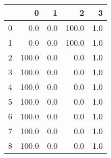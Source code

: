 \begin{tabular}{lrrrr}
\toprule
{} &      0 &    1 &      2 &    3 \\
\midrule
0 &    0.0 &  0.0 &  100.0 &  1.0 \\
1 &    0.0 &  0.0 &  100.0 &  1.0 \\
2 &  100.0 &  0.0 &    0.0 &  1.0 \\
3 &  100.0 &  0.0 &    0.0 &  1.0 \\
4 &  100.0 &  0.0 &    0.0 &  1.0 \\
5 &  100.0 &  0.0 &    0.0 &  1.0 \\
6 &  100.0 &  0.0 &    0.0 &  1.0 \\
7 &  100.0 &  0.0 &    0.0 &  1.0 \\
8 &  100.0 &  0.0 &    0.0 &  1.0 \\
\bottomrule
\end{tabular}
